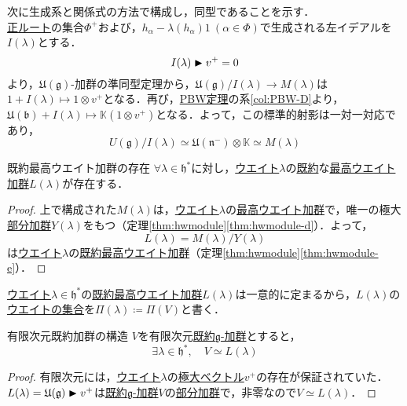 \documentclass[rep_main]{subfiles}
\begin{document}
次に生成系と関係式の方法で構成し，同型であることを示す．\\
\hyperref[def:base-root]{正ルート}の集合$\Phi^+$および，$h_\alpha - \lambda(h_\alpha)1\ (\alpha \in \Phi)$で生成される左イデアルを$I(\lambda)$とする．
\begin{equation}
	I(\lambda) \blacktriangleright v^+ = 0
\end{equation}
より，$\mathfrak{U}(\mathfrak{g})$-加群の準同型定理から，$\mathfrak{U}(\mathfrak{g}) / I(\lambda) \to M(\lambda)$は$1 + I(\lambda) \mapsto 1\otimes v^+$となる．再び，\hyperref[thm:PBW]{PBW定理}の系\ref{col:PBW-D}より，$\mathfrak{U}(\mathfrak{b}) + I(\lambda) \mapsto \mathbb{K}(1\otimes v^+)$となる．よって，この標準的射影は一対一対応であり，
\begin{equation}
	U(\mathfrak{g}) / I(\lambda) \simeq \mathfrak{U}(\mathfrak{n}^-) \otimes \mathbb{K} \simeq M(\lambda)
\end{equation}

\begin{mytheo}[label=thm:hwmodule-exist]{既約最高ウエイト加群の存在}
	$\forall \lambda \in \mathfrak{h}^*$に対し，\hyperref[def:weight-rep]{ウエイト}$\lambda$の\hyperref[def:irr]{既約}な\hyperref[def:highest-weight-module]{最高ウエイト加群}$L(\lambda)$が存在する．
\end{mytheo}
\begin{proof}
	上で構成された$M(\lambda)$は，\hyperref[def:weight-rep]{ウエイト}$\lambda$の\hyperref[def:highest-weight-module]{最高ウエイト加群}で，唯一の極大\hyperref[def:sub-g-module]{部分加群}$Y(\lambda)$をもつ（定理\ref{thm:hwmodule}\ref{thm:hwmodule-d}）．よって，
	\begin{equation}
		L(\lambda) = M(\lambda) / Y(\lambda)
	\end{equation}
	は\hyperref[def:weight-rep]{ウエイト}$\lambda$の\hyperref[def:irr]{既約}\hyperref[def:highest-weight-module]{最高ウエイト加群}（定理\ref{thm:hwmodule}\ref{thm:hwmodule-e}）．
\end{proof}
\hyperref[def:weight-rep]{ウエイト}$\lambda \in \mathfrak{h}^*$の\hyperref[thm:hwmodule-exist]{既約最高ウエイト加群}$L(\lambda)$は一意的に定まるから，$L(\lambda)$の\hyperref[def:weight-rep]{ウエイトの集合}を$\Pi(\lambda) \coloneqq \Pi(V)$と書く．
\begin{mytheo}[label=thm:finite-irr-mod]{有限次元既約加群の構造}
	$V$を有限次元\hyperref[def:irr]{既約$\mathfrak{g}$-加群}とすると，
	\begin{equation}
		\exists \lambda \in \mathfrak{h}^*,\quad  V \simeq L(\lambda)
	\end{equation}
\end{mytheo}
\begin{proof}
	有限次元には，\hyperref[def:weight-rep]{ウエイト}$\lambda$の\hyperref[def:maximal-vector-rep]{極大ベクトル}$v^+$の存在が保証されていた．$L(\lambda) = \mathfrak{U}(\mathfrak{g}) \blacktriangleright v^+$は\hyperref[def:irr]{既約$\mathfrak{g}$-加群}$V$の\hyperref[def:sub-g-module]{部分加群}で，非零なので$V \simeq L(\lambda)$．
\end{proof}
\end{document}
